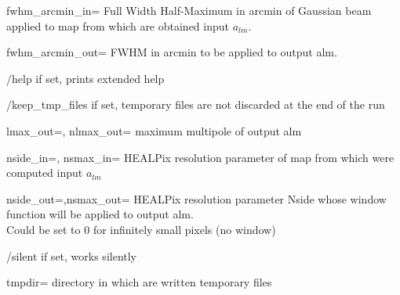 \begin{keywords}
\begin{kwlist}{}
 \item[fwhm\_arcmin\_in=]   Full Width
Half-Maximum in arcmin of Gaussian beam applied to map from which are obtained
input $a_{lm}$.\\

 \item[fwhm\_arcmin\_out=]  FWHM in
arcmin to be applied to output alm.\\ 

 \item[/help]       if set, prints extended help
\item[/keep\_tmp\_files]  if set,
temporary files are not discarded at the end of the run

 \item[lmax\_out=, nlmax\_out=]    
 maximum multipole of output alm

 \item[nside\_in=, nsmax\_in=]     
HEALPix resolution parameter of map
                  from which were computed input $a_{lm}$

 \item[nside\_out=,nsmax\_out=]    
HEALPix resolution parameter Nside whose
                  window function will be applied to output alm.\\
                  Could be set to 0 for infinitely small pixels (no window)

\item[/silent]     if set, works silently

\item[tmpdir=]       directory in which are written temporary files 


  \end{kwlist}
\end{keywords}  

